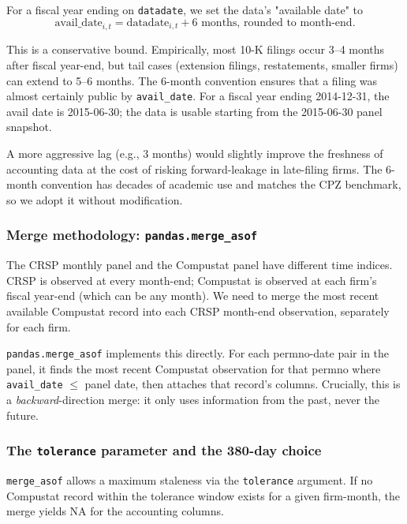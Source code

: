 For a fiscal year ending on \texttt{datadate}, we set the data's
"available date" to
\begin{equation}
\mathrm{avail\_date}_{i,t} = \mathrm{datadate}_{i,t} +
                              \text{6 months, rounded to month-end}.
\label{eq:avail-date}
\end{equation}

This is a conservative bound. Empirically, most 10-K filings occur
3--4 months after fiscal year-end, but tail cases (extension filings,
restatements, smaller firms) can extend to 5--6 months. The 6-month
convention ensures that a filing was almost certainly public by
\texttt{avail\_date}. For a fiscal year ending 2014-12-31, the avail
date is 2015-06-30; the data is usable starting from the 2015-06-30
panel snapshot.

A more aggressive lag (e.g., 3 months) would slightly improve the
freshness of accounting data at the cost of risking forward-leakage in
late-filing firms. The 6-month convention has decades of academic use
and matches the CPZ benchmark, so we adopt it without modification.

\subsubsection{Merge methodology: \texttt{pandas.merge\_asof}}

The CRSP monthly panel and the Compustat panel have different time
indices. CRSP is observed at every month-end; Compustat is observed at
each firm's fiscal year-end (which can be any month). We need to merge
the most recent available Compustat record into each CRSP month-end
observation, separately for each firm.

\texttt{pandas.merge\_asof} implements this directly. For each
permno-date pair in the panel, it finds the most recent Compustat
observation for that permno where \texttt{avail\_date} \(\le\) panel
date, then attaches that record's columns. Crucially, this is a
\emph{backward}-direction merge: it only uses information from the
past, never the future.

\subsubsection{The \texttt{tolerance} parameter and the 380-day choice}

\texttt{merge\_asof} allows a maximum staleness via the \texttt{tolerance}
argument. If no Compustat record within the tolerance window exists for
a given firm-month, the merge yields NA for the accounting columns.

